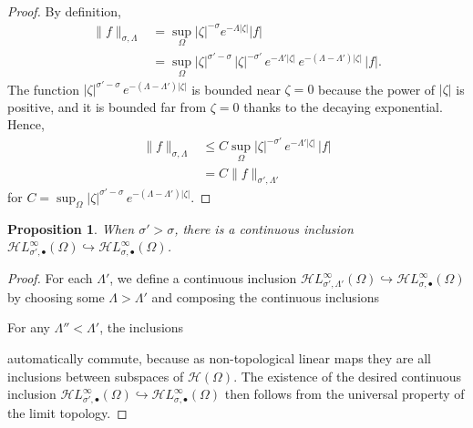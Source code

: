\documentclass{article}
\theoremstyle{definition}
\theoremstyle{plain}
\newtheorem{proposition}{Proposition}
\newcommand{\holo}{\mathcal{H}}
\newcommand{\singexp}[2]{\mathcal{H}L^\infty_{#1, #2}}
\newcommand{\singexpalg}[1]{\singexp{#1}{\bullet}}
\newcommand{\domain}{\Omega}
\begin{document}
\begin{proof}
By definition,
\begin{align*}
\|f\|_{\sigma,\Lambda}&=\sup_{\Omega} |\zeta|^{-\sigma}  e^{-\Lambda |\zeta|} |f|\\
&= \sup_{\Omega} |\zeta|^{\sigma'-\sigma}\,|\zeta|^{-\sigma'}\,e^{-\Lambda'|\zeta|}\,  e^{-(\Lambda-\Lambda') |\zeta|} \, |f|.
\end{align*}
The function $|\zeta|^{\sigma'-\sigma}\,  e^{-(\Lambda-\Lambda') |\zeta|}$ is bounded near $\zeta = 0$ because the power of $|\zeta|$ is positive, and it is bounded far from $\zeta = 0$ thanks to the decaying exponential. Hence,
\begin{align*}
\|f\|_{\sigma,\Lambda}&\leq C\sup_\Omega  |\zeta|^{-\sigma'}\, e^{-\Lambda'|\zeta|} \, |f|\\
&=C \|f\|_{\sigma',\Lambda'}
\end{align*}
for $C = \sup_{\Omega}  |\zeta|^{\sigma'-\sigma}\,  e^{-(\Lambda-\Lambda') |\zeta|}$.
\end{proof}
\begin{proposition}\label{prop:inclus-lt-pow-alg}
When $\sigma' > \sigma$, there is a continuous inclusion $\singexpalg{\sigma'}(\domain)\hookrightarrow \singexpalg{\sigma}(\domain)$.
\end{proposition}
\begin{proof}
For each $\Lambda'$, we define a continuous inclusion $\singexp{\sigma'}{\Lambda'}(\domain) \hookrightarrow \singexpalg{\sigma}(\domain)$ by choosing some $\Lambda > \Lambda'$ and composing the continuous inclusions
\begin{center}
\end{center}
For any $\Lambda'' < \Lambda'$, the inclusions
\begin{center}
\end{center}
automatically commute, because as non-topological linear maps they are all inclusions between subspaces of $\holo(\domain)$. The existence of the desired continuous inclusion $\singexpalg{\sigma'}(\Omega)\hookrightarrow \singexpalg{\sigma}(\Omega)$ then follows from the universal property of the limit topology.
\end{proof}
\end{document}
